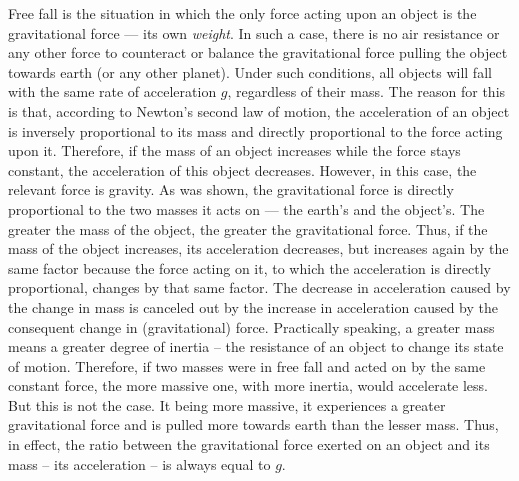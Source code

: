 
Free fall is the situation in which the only force acting upon an object is the gravitational force --- its own \emph{weight}. In such a case, there is no air resistance or any other force to counteract or balance the gravitational force pulling the object towards earth (or any other planet). Under such conditions, all objects will fall with the same rate of acceleration $g$, regardless of their mass. The reason for this is that, according to Newton's second law of motion, the acceleration of an object is inversely proportional to its mass and directly proportional to the force acting upon it. Therefore, if the mass of an object increases while the force stays constant, the acceleration of this object decreases. However, in this case, the relevant force is gravity. As was shown, the gravitational force is directly proportional to the two masses it acts on --- the earth's and the object's. The greater the mass of the object, the greater the gravitational force. Thus, if the mass of the object increases, its acceleration decreases, but increases again by the same factor because the force acting on it, to which the acceleration is directly proportional, changes by that same factor. The decrease in acceleration caused by the change in mass is canceled out by the increase in acceleration caused by the consequent change in (gravitational) force. Practically speaking, a greater mass means a greater degree of inertia -- the resistance of an object to change its state of motion. Therefore, if two masses were in free fall and acted on by the same constant force, the more massive one, with more inertia, would accelerate less. But this is not the case. It being more massive, it experiences a greater gravitational force and is pulled more towards earth than the lesser mass. Thus, in effect, the ratio between the gravitational force exerted on an object and its mass -- its acceleration -- is always equal to $g$.

